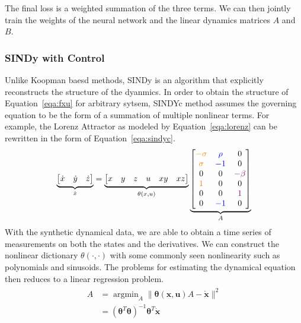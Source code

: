 \documentclass[10pt,twocolumn]{article}
\DeclareMathOperator*{\argmin}{argmin}
\begin{document}
The final loss is a weighted summation of the three terms. We can then jointly train the
weights of the neural network and the linear dynamics matrices $A$ and $B$.

\subsubsection{SINDy with Control \cite{sindyc}}
Unlike Koopman baesd methods, SINDy is an algorithm that explicitly reconstructs the
structure of the dyanmics. In order to obtain the structure of Equation~\ref{eqa:fxu}
for arbitrary sytsem,
SINDYc method assumes the governing equation to be the form of a summation of
multiple nonlinear terms. For example, the Lorenz Attractor as modeled by
Equation~\ref{eqa:lorenz} can be rewritten in the form of Equation~\ref{eqa:sindyc}.
\begin{gather}\label{eqa:lorenz_sindy}
  \underbrace{
    \begin{bmatrix}
      \dot{x} & \dot{y} & \dot{z}
    \end{bmatrix}
  }_{\dot{x}}
  =
  \underbrace{
    \begin{bmatrix}
      x & y & z & u & xy & xz
    \end{bmatrix}
  }_{\theta(x, u)}
  \underbrace{
    \begin{bmatrix}
      {\color{orange}-\sigma} & {\color{blue}\rho} & 0 \\
      {\color{orange}\sigma} & {\color{blue}-1} & 0 \\
      0 & 0 & {\color{violet}-\beta} \\
      {\color{orange}1} & 0 & 0 \\
      0 & 0 & {\color{violet}1} \\
      0 & {\color{blue}-1} & 0
    \end{bmatrix}
  }_{A}
\end{gather}
With the synthetic dynamical data, we are able to obtain a time series of measurements
on both the states and the derivatives. We can construct the nonlinear dictionary
$\theta(\cdot, \cdot)$ with some commonly seen nonlinearity such as polynomials and
sinusoids. The problems for estimating the dynamical equation then reduces to a
linear regression problem.
\begin{gather}
  \begin{aligned}
    A &=  \argmin_A \| \bm{\theta}(\bm{x}, \bm{u})A - \dot{\bm{x}} \|^2 \\
      &= (\bm{\theta}^T \bm{\theta})^{-1}\bm{\theta}^T \dot{\bm{x}}
  \end{aligned}
\end{gather}
\end{document}
